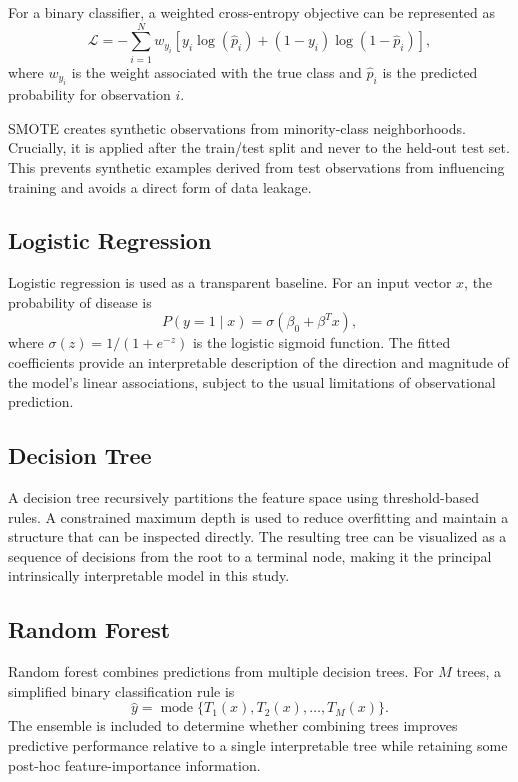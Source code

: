 \documentclass[10pt]{article}
\begin{document}
For a binary classifier, a weighted cross-entropy objective can be represented as
\begin{equation}
\mathcal{L} = -\sum_{i=1}^{N} w_{y_i}\left[y_i\log(\hat{p}_i)+(1-y_i)\log(1-\hat{p}_i)\right],
\end{equation}
where $w_{y_i}$ is the weight associated with the true class and $\hat{p}_i$ is the predicted probability for observation $i$.

SMOTE creates synthetic observations from minority-class neighborhoods. Crucially, it is applied after the train/test split and never to the held-out test set. This prevents synthetic examples derived from test observations from influencing training and avoids a direct form of data leakage.

\subsection{Logistic Regression}
Logistic regression is used as a transparent baseline. For an input vector $x$, the probability of disease is
\begin{equation}
P(y=1\mid x) = \sigma(\beta_0 + \beta^T x),
\end{equation}
where $\sigma(z)=1/(1+e^{-z})$ is the logistic sigmoid function. The fitted coefficients provide an interpretable description of the direction and magnitude of the model's linear associations, subject to the usual limitations of observational prediction.

\subsection{Decision Tree}
A decision tree recursively partitions the feature space using threshold-based rules. A constrained maximum depth is used to reduce overfitting and maintain a structure that can be inspected directly. The resulting tree can be visualized as a sequence of decisions from the root to a terminal node, making it the principal intrinsically interpretable model in this study.

\subsection{Random Forest}
Random forest combines predictions from multiple decision trees. For $M$ trees, a simplified binary classification rule is
\begin{equation}
\hat{y} = \operatorname{mode}\{T_1(x),T_2(x),\ldots,T_M(x)\}.
\end{equation}
The ensemble is included to determine whether combining trees improves predictive performance relative to a single interpretable tree while retaining some post-hoc feature-importance information.
\end{document}
